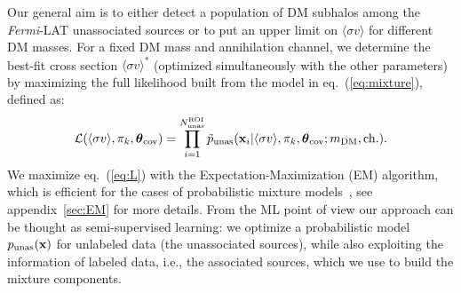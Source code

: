\documentclass[12pt, a4paper]{article}
\newcommand{\Fermi}{{\textit{Fermi}}}
\newcommand{\be}{\begin{equation}}
\newcommand{\ee}{\end{equation}}
\newcommand{\bx}{{\bf x}}
\newcommand{\btheta}{\boldsymbol{\theta}}
\newcommand{\sigmav}{\langle \sigma v \rangle}
\begin{document}
Our general aim is to either detect a population of DM subhalos among the \Fermi-LAT unassociated sources or to put an upper limit on $\langle\sigma v\rangle$ for different DM masses. For a fixed DM mass and annihilation channel, we determine the best-fit cross section $\langle\sigma v\rangle^*$ (optimized simultaneously with the other parameters) by maximizing the full likelihood built from the model in eq.~(\ref{eq:mixture}), defined as:
\be
\label{eq:L}
{\cal L}(\langle\sigma v\rangle, \pi_k, \btheta_{\rm cov}) = \prod_{i=1}^{N^{\rm ROI}_{\rm unas}} \tilde{p}_{\rm unas}(\bx_i|\sigmav,\pi_k, \btheta_{\rm cov};m_{\rm DM},{\rm ch.}).
\ee
We maximize eq.~(\ref{eq:L}) with the Expectation-Maximization (EM) algorithm, which is efficient for the cases of probabilistic mixture models~\cite{10.1162/089976602753284446_Saerens}, see appendix~\ref{sec:EM} for more details.
From the ML point of view our approach can be thought as semi-supervised learning: we optimize a probabilistic model $p_{\rm unas}({\bf x})$ for unlabeled data (the unassociated sources), while also exploiting the information of labeled data, i.e., the associated sources, which we use to build the mixture components. 
\end{document}
